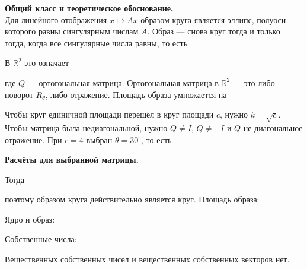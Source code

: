 \documentclass[a4paper,14pt]{extarticle}
\begin{document}
\textbf{Общий класс и теоретическое обоснование.}\\
Для линейного отображения \(x\mapsto Ax\) образом круга является эллипс,
полуоси которого равны сингулярным числам \(A\). Образ --- снова круг
тогда и только тогда, когда все сингулярные числа равны, то есть \begin{center}\end{center} В \(\mathbb R^2\) это означает \begin{center}\end{center} где \(Q\) --- ортогональная матрица. Ортогональная матрица в
\(\mathbb R^2\) --- это либо поворот \(R_\theta\), либо отражение.
Площадь образа умножается на \begin{center}\end{center} Чтобы круг единичной площади перешёл в круг площади \(c\), нужно
\(k=\sqrt c\). Чтобы матрица была недиагональной, нужно \(Q\ne I\),
\(Q\ne -I\) и \(Q\) не диагональное отражение. При \(c=4\) выбран
\(\theta=30^\circ\), то есть \begin{center}\end{center}

\textbf{Расчёты для выбранной матрицы.} \begin{center}\end{center} Тогда \begin{center}\end{center} поэтому образом круга действительно является круг. Площадь образа: \begin{center}\end{center} Ядро и образ: \begin{center}\end{center} Собственные числа: \begin{center}\end{center} \begin{center}\end{center} Вещественных собственных чисел и вещественных собственных векторов
нет.
\end{document}
